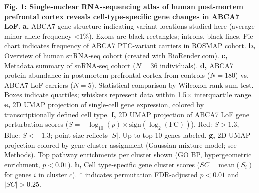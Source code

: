 \textbf{Fig. 1: Single-nuclear RNA-sequencing atlas of human post-mortem prefrontal cortex reveals cell-type-specific gene changes in ABCA7 LoF.}\newline  %
\textbf{a,} ABCA7 gene structure indicating variant locations studied here (average minor allele frequency <1\%). Exons are black rectangles; introns, black lines. Pie chart indicates frequency of ABCA7 PTC-variant carriers in ROSMAP cohort.
\textbf{b,} Overview of human snRNA-seq cohort (created with BioRender.com).
\textbf{c,} Metadata summary of snRNA-seq cohort ($N=36$ individuals).
\textbf{d,} ABCA7 protein abundance in postmortem prefrontal cortex from controls ($N=180$) vs. ABCA7 LoF carriers ($N=5$). Statistical comparison by Wilcoxon rank sum test. Boxes indicate quartiles; whiskers represent data within 1.5× interquartile range.
\textbf{e,} 2D UMAP projection of single-cell gene expression, colored by transcriptionally defined cell type.
\textbf{f,} 2D UMAP projection of ABCA7 LoF gene perturbation scores ($S = -\log_{10}(p)\times\text{sign}(\log_2(\text{FC}))$). Red: $S>1.3$, Blue: $S<-1.3$; point size reflects $|S|$. Up to top 10 genes labeled.
\textbf{g,} 2D UMAP projection colored by gene cluster assignment (Gaussian mixture model; see Methods). Top pathway enrichments per cluster shown (GO BP, hypergeometric enrichment, $p<0.01$).
\textbf{h,} Cell type-specific gene cluster scores ($SC=\text{mean}(S_i)$ for genes $i$ in cluster $c$). * indicates permutation FDR-adjusted $p<0.01$ and $|SC|>0.25$.

